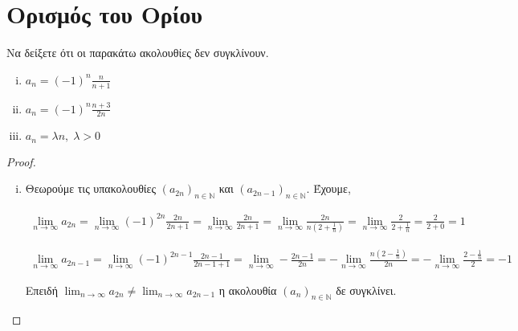 \section{Ορισμός του Ορίου}




\begin{enumerate}

    \item Να δείξετε ότι οι παρακάτω ακολουθίες δεν συγκλίνουν.
        \begin{enumerate}[i)]
            \item $ a_{n} = (-1)^{n} \frac{n}{n+1} $ 
            \item $ a_{n} = (-1)^{n} \frac{n+3}{2n} $ 
            \item $ a_{n} = \lambda n, \; \lambda > 0 $ 
        \end{enumerate}

        \begin{proof}
        \item {}
            \begin{enumerate}[i)]
                \item Θεωρούμε τις υπακολουθίες $(a_{2n})_{n \in \mathbb{N}} $ 
                    και $(a_{2n-1})_{n \in \mathbb{N}} $. Έχουμε,

                    \begin{align*} 
                        \lim_{n \to \infty} a_{2n} = \lim_{n \to \infty}  (-1)^{2n} 
                        \frac{2n}{2n+1} = \lim_{n \to \infty}  \frac{2n}{2n+1} = 
                        \lim_{n \to \infty} \frac{2n}{n(2 + \frac{1}{n})} = 
                        \lim_{n \to \infty} \frac{2}{2 + \frac{1}{n}} = 
                        \frac{2}{2+0} = 1 
                    \end{align*}

                    \begin{align*} 
                        \lim_{n \to \infty} a_{2n-1} = \lim_{n \to \infty} 
                        (-1)^{2n-1} \frac{2n-1}{2n-1 + 1} = \lim_{n \to \infty} - 
                        \frac{2n-1}{2n} = -\lim_{n \to \infty} 
                        \frac{n (2 - \frac{1}{n})}{2n} = - \lim_{n \to \infty} 
                        \frac{2 - \frac{1}{n} }{2} = -1 
                    \end{align*}

                    Επειδή $ \lim_{n \to \infty} a_{2n} \neq \lim_{n \to \infty} a_{2n-1} $
                    η ακολουθία $ (a_{n})_{n \in \mathbb{N}} $ δε συγκλίνει.


\end{enumerate}
\end{proof}
\end{enumerate}
